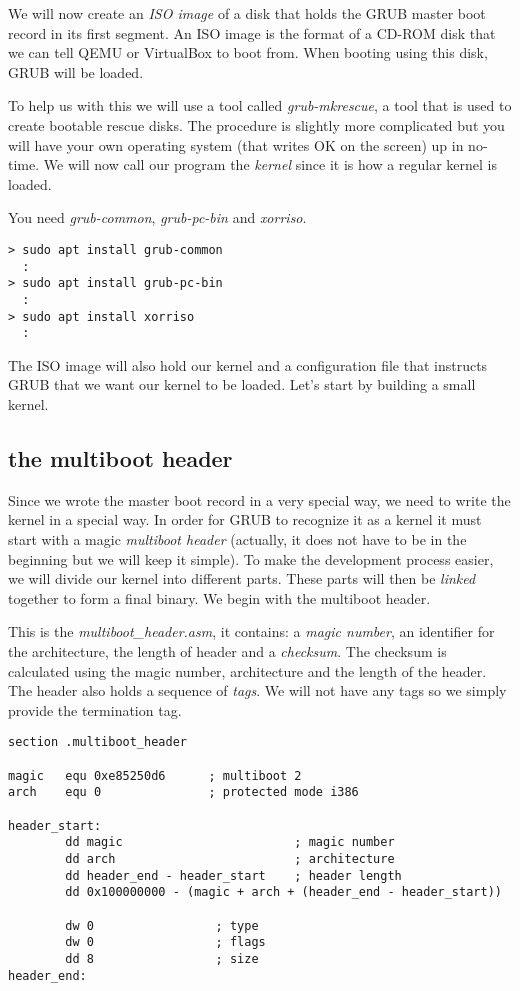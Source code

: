 \documentclass[a4paper,11pt]{article}
\begin{document}
We will now create an {\em ISO image} of a disk that holds the GRUB
master boot record in its first segment.  An ISO image is the format
of a CD-ROM disk that we can tell QEMU or VirtualBox to boot
from. When booting using this disk, GRUB will be loaded.

To help us with this we will use a tool called {\em grub-mkrescue}, a
tool that is used to create bootable rescue disks. The procedure is
slightly more complicated but you will have your own operating system
(that writes OK on the screen) up in no-time. We will now call our
program the {\em kernel} since it is how a regular kernel is loaded.

You need {\em grub-common}, {\em grub-pc-bin} and {\em xorriso}.

\begin{verbatim}
> sudo apt install grub-common
  :
> sudo apt install grub-pc-bin
  :
> sudo apt install xorriso
  :
\end{verbatim}

The ISO image will also hold our kernel and a configuration file that
instructs GRUB that we want our kernel to be loaded. Let's start by
building a small kernel.

\subsection{the multiboot header}

Since we wrote the master boot record in a very special way, we
need to write the kernel in a special way. In order for GRUB to
recognize it as a kernel it must start with a magic {\em multiboot
  header} (actually, it does not have to be in the beginning but we
will keep it simple). To make the development process easier, we will
divide our kernel into different parts. These parts will then be {\em
  linked} together to form a final binary. We begin with the multiboot
header.

This is the {\em multiboot\_header.asm}, it contains: a {\em magic
  number}, an identifier for the architecture, the length of header
and a {\em checksum}. The checksum is calculated using the magic
number, architecture and the length of the header. The header also
holds a sequence of {\em tags}. We will not have any tags so we simply
provide the termination tag.

\begin{verbatim}
section .multiboot_header

magic   equ 0xe85250d6      ; multiboot 2
arch    equ 0               ; protected mode i386

header_start:
        dd magic                        ; magic number
        dd arch                         ; architecture
        dd header_end - header_start    ; header length 
        dd 0x100000000 - (magic + arch + (header_end - header_start))

        dw 0                 ; type
        dw 0                 ; flags
        dd 8                 ; size
header_end:
\end{verbatim}
 
\end{document}
